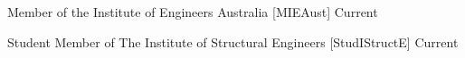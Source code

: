 

\begin{cvhonors}

  \cvhonor
    {Member of the Institute of Engineers Australia} %
    {[MIEAust]} %
    {} %
    {Current} %

  \cvhonor
    {Student Member of The Institute of Structural Engineers} %
    {[StudIStructE]} %
    {} %
    {Current} %

\end{cvhonors}
